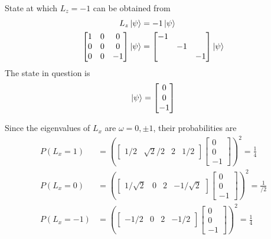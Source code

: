 \documentclass[../../../main.tex]{subfiles}
\begin{document}
State at which $L_z=-1$ can be obtained from
\begin{align*}
    L_z \ket{\psi} & =-  1 \ket{\psi} \\
    \begin{bmatrix}
                            1 & 0 & 0  \\
                            0 & 0 & 0  \\
                            0 & 0 & -1 \\
                        \end{bmatrix}
    \ket{\psi}     & =
    \begin{bmatrix}
        -1 &    &    \\
           & -1 &    \\
           &    & -1 \\
    \end{bmatrix}
    \ket{\psi}
\end{align*}
The state in question is
\begin{equation*}
    \ket{\psi}=
    \begin{bmatrix}
        0 \\0\\-1\\
    \end{bmatrix}
\end{equation*}

Since the eigenvalues of $L_x$ are $\omega=0,\pm 1$, their probabilities are
\begin{align*}
    P(L_x=1)  & = \left(
    \begin{bmatrix}
            1/2 & \sqrt{2}/2 & 2 & 1/2
        \end{bmatrix}
    \begin{bmatrix}
            0 \\0\\-1
        \end{bmatrix}
    \right) ^2=\frac{1 }{4}  \\
    P(L_x=0)  & = \left(
    \begin{bmatrix}
            1/\sqrt{2} & 0 & 2 & -1/\sqrt{2}
        \end{bmatrix}
    \begin{bmatrix}
            0 \\0\\-1
        \end{bmatrix}
    \right) ^2=\frac{1 }{/2} \\
    P(L_x=-1) & = \left(
    \begin{bmatrix}
            -1/2 & 0 & 2 & -1/2
        \end{bmatrix}
    \begin{bmatrix}
            0 \\0\\-1
        \end{bmatrix}
    \right) ^2=\frac{1 }{4}  \\
\end{align*}
\end{document}

